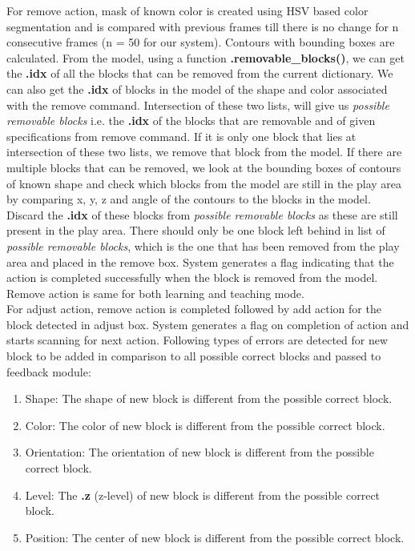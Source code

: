 For remove action, mask of known color is created using HSV based color segmentation and is compared with previous frames till there is no change for n consecutive frames (n = 50 for our system). Contours with bounding boxes are calculated. From the model, using a function \textbf{.removable\_blocks()}, we can get the \textbf{.idx} of all the blocks that can be removed from the current dictionary. We can also get the \textbf{.idx} of blocks in the model of the shape and color associated with the remove command. Intersection of these two lists, will give us \emph{possible removable blocks} i.e. the \textbf{.idx} of the blocks that are removable and of given specifications from remove command. If it is only one block that lies at intersection of these two lists, we remove that block from the model. If there are multiple blocks that can be removed, we look at the bounding boxes of contours of known shape and check which blocks from the model are still in the play area by comparing x, y, z and angle of the contours to the blocks in the model. Discard the \textbf{.idx} of these blocks from \emph{possible removable blocks} as these are still present in the play area. There should only be one block left behind in list of \emph{possible removable blocks}, which is the one that has been removed from the play area and placed in the remove box. System generates a flag indicating that the action is completed successfully when the block is removed from the model. Remove action is same for both learning and teaching mode. \\
For adjust action, remove action is completed followed by add action for the block detected in adjust box. System generates a flag on completion of action and starts scanning for next action. 
Following types of errors are detected for new block to be added in comparison to all possible correct blocks and passed to feedback module:
\begin{enumerate}
    \item Shape: The shape of new block is different from the possible correct block.
    \item Color: The color of new block is different from the possible correct block.
    \item Orientation: The orientation of new block is different from the possible correct block.
    \item Level: The \textbf{.z} (z-level) of new block is different from the possible correct block.
    \item Position: The center of new block is different from the possible correct block.
\end{enumerate}


